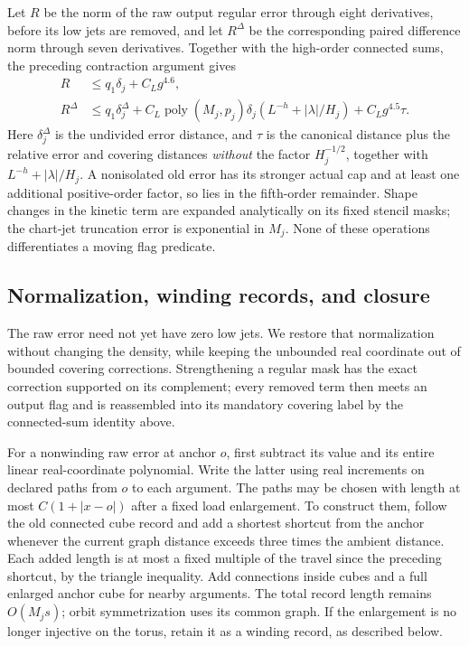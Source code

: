 Let $R$ be the norm of the raw output regular error through eight
derivatives, before its low jets are removed, and let $R^\Delta$ be
the corresponding paired difference norm through seven derivatives.
Together with the high-order connected sums, the preceding contraction
argument gives
\begin{equation}
 \begin{split}
 R&\le q_1\delta_j+C_Lg^{4.6},\\
 R^\Delta&\le q_1\delta_j^\Delta+
       C_L\operatorname{poly}(M_j,p_j)\delta_j
                     (L^{-h}+|\lambda|/H_j)+C_Lg^{4.5}\tau.
 \end{split}
 \label{eq:rg-raw-remainders}
\end{equation}
Here $\delta_j^\Delta$ is the undivided error distance, and $\tau$ is
the canonical distance plus the relative error and covering distances
\emph{without} the factor $H_j^{-1/2}$, together with
$L^{-h}+|\lambda|/H_j$.  A nonisolated old error has its stronger actual
cap and at least one additional positive-order factor, so lies in the
fifth-order remainder.  Shape changes in the kinetic term are expanded
analytically on its fixed stencil masks; the chart-jet truncation error
is exponential in $M_j$.  None of these operations differentiates a
moving flag predicate.

\subsection{Normalization, winding records, and closure}

The raw error need not yet have zero low jets.  We restore that
normalization without changing the density, while keeping the
unbounded real coordinate out of bounded covering corrections.
Strengthening a regular mask has the exact correction supported on its
complement; every removed term then meets an output flag and is
reassembled into its mandatory covering label by the connected-sum
identity above.

For a nonwinding raw error at anchor $o$, first subtract its value and
its entire linear real-coordinate polynomial.  Write the latter using
real increments on declared paths from $o$ to each argument.  The paths
may be chosen with length at most $C(1+|x-o|)$ after a fixed load
enlargement.  To construct them, follow the old connected cube record
and add a shortest shortcut from the anchor whenever the current graph
distance exceeds three times the ambient distance.  Each added length
is at most a fixed multiple of the travel since the preceding shortcut,
by the triangle inequality.  Add connections inside cubes and a full
enlarged anchor cube for nearby arguments.  The total record length
remains $O(M_js)$; orbit symmetrization uses its common graph.  If the
enlargement is no longer injective on the torus, retain it as a winding
record, as described below.

